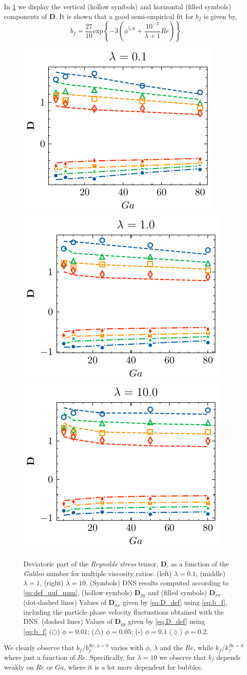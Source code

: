 In \ref{fig:bf} we display the vertical (hollow symbols) and horizontal (filled symbols) components of $\textbf{D}$. 
It is shown that a good semi-empirical fit for $b_f$ is given by, 
\begin{equation}
    b_f = \frac{27}{10}  \text{exp}\left\{- 3\left(\phi^{5/6} + \frac{10^{-3}}{\lambda+1}Re\right)\right\}. 
    \label{eq:b_f}
\end{equation}
\begin{figure}
    \centering
    \includegraphics[height = 0.25\textwidth]{image/HOMOGENEOUS_final/CA/D2_l_0.pdf}
    \includegraphics[height = 0.25\textwidth]{image/HOMOGENEOUS_final/CA/D2_l_1.pdf}
    \includegraphics[height = 0.25\textwidth]{image/HOMOGENEOUS_final/CA/D2_l_10.pdf}
    \caption{Deviatoric part of the \textit{Reynolds stress} tensor, $\textbf{D}$, as a function of the \textit{Galileo} number for multiple viscosity ratios:
    (left) $\lambda = 0.1$,
    (middle) $\lambda = 1$,
    (right) $\lambda = 10$. 
    (Symbols) DNS results computed according to \ref{eq:def_uuf_num}, (hollow symbols) $\textbf{D}_{yy}$ and (filled symbols) $\textbf{D}_{xx}$. 
    (dot-dashed lines) Values of $\textbf{D}_{xx}$ given by \ref{eq:D_def} using \ref{eq:b_f}, including the particle phase velocity fluctuations obtained with the DNS. 
    (dashed lines) Values of $\textbf{D}_{yy}$ given by \ref{eq:D_def} using \ref{eq:b_f}
    ($\pmb\bigcirc$) $\phi = 0.01$; ($\pmb\triangle$) $ \phi = 0.05$; ($\pmb\square$) $\phi = 0.1$ ($\pmb\lozenge$) $\phi = 0.2$.
    }
    \label{fig:bf}
\end{figure}
We clearly observe that $b_f/b_f^{Re,\phi = 0}$ varies with $\phi$, $\lambda$ and the $Re$, while $k_f/k_f^{Re = 0}$ where just a function of $Re$. 
Specifically, for $\lambda = 10$ we observe that $b_f$ depends weakly on $Re$ or $Ga$, where it is a lot more dependent for bubbles. 

